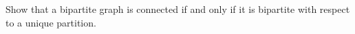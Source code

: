 Show that a bipartite graph is connected if and only if it is bipartite with respect to a unique partition.
